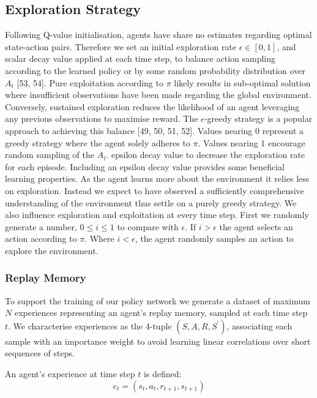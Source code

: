 \documentclass[runningheads]{llncs}
\begin{document}
\subsection{Exploration Strategy}
Following Q-value initialisation, agents have share no estimates regarding optimal state-action pairs. Therefore we set an initial exploration rate $\epsilon \in [0,1]$, and scalar decay value  applied at each time step, to balance action sampling according to the learned policy or by some random probability distribution over $A_t$ [53, 54]. Pure exploitation according to $\pi$ likely results in sub-optimal solution where insufficient observations have been made regarding the global environment. Conversely, sustained exploration reduces the likelihood of an agent leveraging any previous observations to maximise reward. The $\epsilon$-greedy strategy is a popular approach to achieving this balance [49, 50, 51, 52]. Values nearing 0 represent a greedy strategy where the agent solely adheres to $\pi$. Values nearing 1 encourage random sampling of the $A_t$. epsilon decay value to decrease the exploration rate for each episode. Including an epsilon decay value provides some beneficial learning properties. As the agent learns more about the environment it relies less on exploration. Instead we expect to have observed a sufficiently comprehensive
understanding of the environment thus settle on a purely greedy strategy. We also influence exploration and exploitation at every time step. First we randomly generate a number, $0 \leq i \leq 1$ to compare with $\epsilon$. If $i > \epsilon$ the agent selects an action according to $\pi$. Where $i < \epsilon$, the agent randomly samples an action to explore the environment. 

\subsubsection{Replay Memory}
To support the training of our policy network we generate a dataset of maximum $N$ experiences representing an agent's replay memory, sampled at each time step $t$. We characterise experiences as the 4-tuple $(S,A,R,S^{\prime})$, associating each sample with an importance weight to avoid learning linear correlations over short sequences of steps. 

\begin{theorem}
	An agent's experience at time step $t$ is defined:
	\begin{equation}
		e_{t} = (s_t,a_t,r_{t+1},s_{t+1})
	\end{equation}
\end{theorem}
\end{document}

